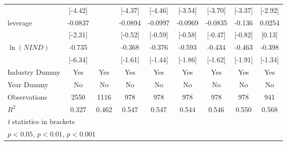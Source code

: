 {\begin{tabular}{l*{8}{c}}
                    &     [-4.42]         &                     &     [-4.37]         &     [-4.46]         &     [-3.54]         &     [-3.70]         &     [-3.37]         &     [-2.92]         \\
[1em]
leverage            &     -0.0837         &                     &     -0.0894         &     -0.0997         &     -0.0969         &     -0.0835         &      -0.136         &      0.0254         \\
                    &     [-2.31]         &                     &     [-0.52]         &     [-0.59]         &     [-0.58]         &     [-0.47]         &     [-0.82]         &      [0.13]         \\
[1em]
 $ \ln(NIND) $      &      -0.735\sym{**} &                     &      -0.368         &      -0.376         &      -0.593         &      -0.434         &      -0.463         &      -0.398         \\
                    &     [-6.34]         &                     &     [-1.61]         &     [-1.44]         &     [-1.86]         &     [-1.62]         &     [-1.91]         &     [-1.34]         \\
\hline
Industry Dummy      &         Yes         &         Yes         &         Yes         &         Yes         &         Yes         &         Yes         &         Yes         &         Yes         \\
Year Dummy          &          No         &          No         &          No         &          No         &          No         &          No         &          No         &          No         \\
Observations        &        2550         &        1116         &         978         &         978         &         978         &         978         &         978         &         941         \\
$ R^2 $             &       0.327         &       0.462         &       0.547         &       0.547         &       0.544         &       0.546         &       0.550         &       0.568         \\
\hline\hline
\multicolumn{9}{l}{\footnotesize \textit{t} statistics in brackets}\\
\multicolumn{9}{l}{\footnotesize \sym{*} \(p<0.05\), \sym{**} \(p<0.01\), \sym{***} \(p<0.001\)}\\
\end{tabular}
}
